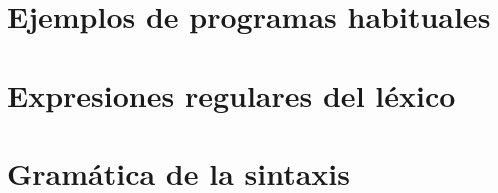 \documentclass[10pt,a4paper]{article}
\begin{document}
\newpage
\appendix

\section{Ejemplos de programas habituales}\label{sec:Ejemplos de programas habituales}







\section{Expresiones regulares del léxico}
\label{sec:Expresiones regulares del léxico}

\section{Gramática de la sintaxis}
\label{sec:Gramática de la sintaxis}
\end{document}
